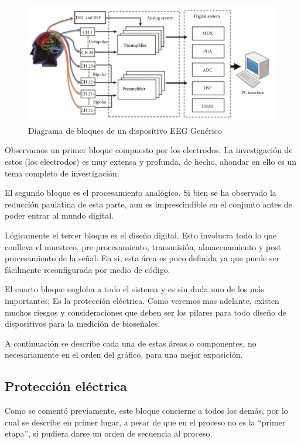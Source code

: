 \documentclass[11pt]{article}
\begin{document}
\begin{figure}[htbp]
\centering
\includegraphics[width=.9\linewidth]{./bloques_EEG.png}
\caption{\label{fig:bloques_eeg}Diagrama de bloques de un dispositivo EEG Genérico}
\end{figure}



Observamos un primer bloque compuesto por los electrodos. La investigación de estos (los electrodos) es muy extensa y profunda, de hecho, ahondar en ello es un tema completo de investigación.

El segundo bloque es el procesamiento analógico. Si bien se ha observado la reducción paulatina de esta parte, aun es imprescindible en el conjunto antes de poder entrar al mundo digital.

Lógicamente el tercer bloque es el diseño digital. Esto involucra todo lo que conlleva el muestreo, pre procesamiento, transmisión, almacenamiento y post procesamiento de la señal. En si, esta área es poco definida ya que puede ser fácilmente reconfigurada por medio de código.

El cuarto bloque engloba a todo el sistema y es sin duda uno de los más importantes; Es la protección eléctrica. Como veremos mas adelante, existen muchos riesgos y consideraciones que deben ser los pilares para todo diseño de dispositivos para la medición de bioseñales.

A continuación se describe cada una de estas áreas o componentes, no necesariamente en el orden del gráfico, para una mejor exposición.

\subsection{Protección eléctrica}
\label{sec:orge8b82b2}
Como se comentó previamente, este bloque concierne a todos los demás, por lo cual se describe en primer lugar, a pesar de que en el proceso no es la “primer etapa”, si pudiera darse un orden de secuencia al proceso.
\end{document}
